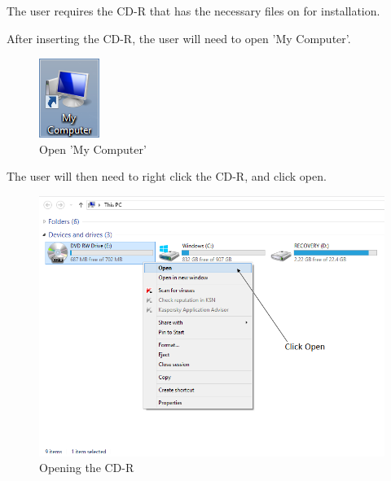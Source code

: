 The user requires the CD-R that has the necessary files on for installation. 


After inserting the CD-R, the user will need to open 'My Computer'.

\begin{figure}[H]
    \includegraphics[width=\textwidth]{./Manual/Installation/MyComputer.png}
    \caption{Open 'My Computer'}
\end{figure}

The user will then need to right click the CD-R, and click open.

\begin{figure}[H]
    \includegraphics[width=\textwidth]{./Manual/Installation/OpenCDR.png}
    \caption{Opening the CD-R}
\end{figure}

